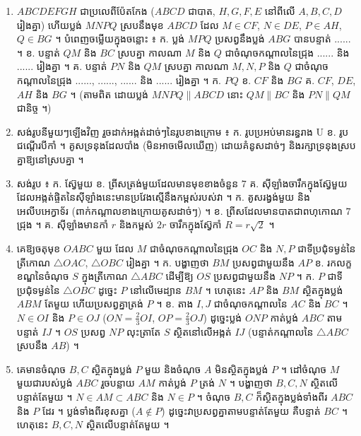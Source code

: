 \begin{enumerate}[1]
  \item $ABCDEFGH$ ជាប្រលេពីប៉ែតកែង ($ABCD$ ជាបាត, $H, G, F, E$ នៅពីលើ $A, B, C, D$ រៀងគ្នា) ហើយប្លង់ $MNPQ$ ស្របនឹងមុខ $ABCD$ ដែល $M \in CF$, $N \in DE$, $P \in AH$, $Q \in BG$ ។ បំពេញចម្លើយក្នុងចន្លោះ ៖ \quad ក. ប្លង់ $MPQ$ ប្រសព្វនឹងប្លង់ $ABG$ បានបន្ទាត់ ...... ។ \quad ខ. បន្ទាត់ $QM$ និង $BC$ ស្របគ្នា កាលណា $M$ និង $Q$ ជាចំណុចកណ្ដាលនៃជ្រុង ...... និង ...... រៀងគ្នា ។ \quad គ. បន្ទាត់ $PN$ និង $QM$ ស្របគ្នា កាលណា $M, N, P$ និង $Q$ ជាចំណុចកណ្ដាលនៃជ្រុង ......, ......, ...... និង ...... រៀងគ្នា ។
  \ans
  ក. $PQ$ \quad ខ. $CF$ និង $BG$ \quad គ. $CF$, $DE$, $AH$ និង $BG$ ។ (តាមពិត ដោយប្លង់ $MNPQ \parallel ABCD$ នោះ $QM \parallel BC$ និង $PN \parallel QM$ ជានិច្ច ។)
  \item សង់រូបនីមួយៗឡើងវិញ រួចដាក់អង្កត់ដាច់ៗនៃរូបខាងក្រោម ៖ ក. រូបប្រអប់មានរន្ធរាង U \quad ខ. រូបជណ្ដើរបីកាំ ។
  \ans
  គូសទ្រនុងដែលបាំង (មិនអាចមើលឃើញ) ដោយគំនូសដាច់ៗ និងរក្សាទ្រនុងស្របគ្នាឱ្យនៅស្របគ្នា ។
  \item សង់រូប ៖ \quad ក. ស្វ៊ែមួយ \quad ខ. ព្រីសត្រង់មួយដែលមានមុខខាងចំនួន $7$ \quad គ. ស៊ីឡាំងចារឹកក្នុងស្វ៊ែមួយ ដែលអង្កត់ផ្ចិតនៃស៊ីឡាំងនេះមានប្រវែងស្មើនឹងកម្ពស់របស់វា ។
  \ans
  ក. គូសរង្វង់មួយ និងអេលីបអេក្វាទ័រ (ពាក់កណ្ដាលខាងក្រោយគូសដាច់ៗ) ។ \quad ខ. ព្រីសដែលមានបាតជាពហុកោណ $7$ ជ្រុង ។ \quad គ. ស៊ីឡាំងមានកាំ $r$ និងកម្ពស់ $2r$ ចារឹកក្នុងស្វ៊ែកាំ $R = r\sqrt{2}$ ។
  \item គេឱ្យចតុមុខ $OABC$ មួយ ដែល $M$ ជាចំណុចកណ្ដាលនៃជ្រុង $OC$ និង $N, P$ ជាទីប្រជុំទម្ងន់នៃត្រីកោណ $\triangle OAC$, $\triangle OBC$ រៀងគ្នា ។ \quad ក. បង្ហាញថា $BM$ ប្រសព្វជាមួយនឹង $AP$ \quad ខ. រកលក្ខខណ្ឌនៃចំណុច $S$ ក្នុងត្រីកោណ $\triangle ABC$ ដើម្បីឱ្យ $OS$ ប្រសព្វជាមួយនឹង $NP$ ។
  \ans
  ក. $P$ ជាទីប្រជុំទម្ងន់នៃ $\triangle OBC$ ដូច្នេះ $P$ នៅលើមេដ្យាន $BM$ ។ ហេតុនេះ $AP$ និង $BM$ ស្ថិតក្នុងប្លង់ $ABM$ តែមួយ ហើយប្រសព្វគ្នាត្រង់ $P$ ។ \quad ខ. តាង $I, J$ ជាចំណុចកណ្ដាលនៃ $AC$ និង $BC$ ។ $N \in OI$ និង $P \in OJ$ ($ON = \tfrac{2}{3}OI$, $OP = \tfrac{2}{3}OJ$) ដូច្នេះប្លង់ $ONP$ កាត់ប្លង់ $ABC$ តាមបន្ទាត់ $IJ$ ។ $OS$ ប្រសព្វ $NP$ លុះត្រាតែ $S$ ស្ថិតនៅលើអង្កត់ $IJ$ (បន្ទាត់កណ្ដាលនៃ $\triangle ABC$ ស្របនឹង $AB$) ។
  \item គេមានចំណុច $B, C$ ស្ថិតក្នុងប្លង់ $P$ មួយ និងចំណុច $A$ មិនស្ថិតក្នុងប្លង់ $P$ ។ ដៅចំណុច $M$ មួយជារបស់ប្លង់ $ABC$ រួចបន្លាយ $AM$ កាត់ប្លង់ $P$ ត្រង់ $N$ ។ បង្ហាញថា $B, C, N$ ស្ថិតលើបន្ទាត់តែមួយ ។
  \ans
  $N \in AM \subset ABC$ និង $N \in P$ ។ ចំណុច $B, C$ ក៏ស្ថិតក្នុងប្លង់ទាំងពីរ $ABC$ និង $P$ ដែរ ។ ប្លង់ទាំងពីរខុសគ្នា ($A \notin P$) ដូច្នេះវាប្រសព្វគ្នាតាមបន្ទាត់តែមួយ គឺបន្ទាត់ $BC$ ។ ហេតុនេះ $B, C, N$ ស្ថិតលើបន្ទាត់តែមួយ ។
\end{enumerate}
